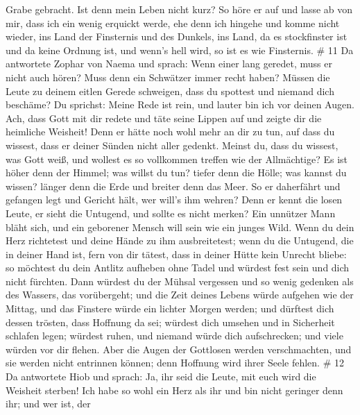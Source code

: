 Grabe gebracht.  Ist denn mein Leben nicht kurz? So höre er
auf und lasse ab von mir, dass ich ein wenig erquickt werde,
 ehe denn ich hingehe und komme nicht wieder, ins Land der
Finsternis und des Dunkels,  ins Land, da es stockfinster
ist und da keine Ordnung ist, und wenn's hell wird, so ist es wie
Finsternis. \# 11  Da antwortete Zophar von Naema und
sprach:  Wenn einer lang geredet, muss er nicht auch hören?
Muss denn ein Schwätzer immer recht haben?  Müssen die Leute
zu deinem eitlen Gerede schweigen, dass du spottest und niemand dich
beschäme?  Du sprichst: Meine Rede ist rein, und lauter bin
ich vor deinen Augen.  Ach, dass Gott mit dir redete und
täte seine Lippen auf  und zeigte dir die heimliche
Weisheit! Denn er hätte noch wohl mehr an dir zu tun, auf dass du
wissest, dass er deiner Sünden nicht aller gedenkt.  Meinst
du, dass du wissest, was Gott weiß, und wollest es so vollkommen treffen
wie der Allmächtige?  Es ist höher denn der Himmel; was
willst du tun? tiefer denn die Hölle; was kannst du wissen? 
länger denn die Erde und breiter denn das Meer.  So er
daherfährt und gefangen legt und Gericht hält, wer will's ihm wehren?
 Denn er kennt die losen Leute, er sieht die Untugend, und
sollte es nicht merken?  Ein unnützer Mann bläht sich, und
ein geborener Mensch will sein wie ein junges Wild.  Wenn
du dein Herz richtetest und deine Hände zu ihm ausbreitetest;
 wenn du die Untugend, die in deiner Hand ist, fern von dir
tätest, dass in deiner Hütte kein Unrecht bliebe:  so
möchtest du dein Antlitz aufheben ohne Tadel und würdest fest sein und
dich nicht fürchten.  Dann würdest du der Mühsal vergessen
und so wenig gedenken als des Wassers, das vorübergeht; 
und die Zeit deines Lebens würde aufgehen wie der Mittag, und das
Finstere würde ein lichter Morgen werden;  und dürftest
dich dessen trösten, dass Hoffnung da sei; würdest dich umsehen und in
Sicherheit schlafen legen;  würdest ruhen, und niemand
würde dich aufschrecken; und viele würden vor dir flehen. 
Aber die Augen der Gottlosen werden verschmachten, und sie werden nicht
entrinnen können; denn Hoffnung wird ihrer Seele fehlen. \# 12
 Da antwortete Hiob und sprach:  Ja, ihr seid
die Leute, mit euch wird die Weisheit sterben!  Ich habe so
wohl ein Herz als ihr und bin nicht geringer denn ihr; und wer ist, der
